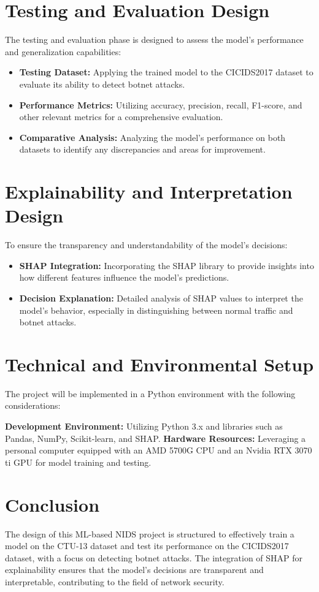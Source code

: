 \section{Testing and Evaluation Design}
The testing and evaluation phase is designed to assess the model's performance and generalization capabilities:

\begin{itemize}
    \item \textbf{Testing Dataset:} Applying the trained model to the CICIDS2017 dataset to evaluate its ability to detect botnet attacks.
    \item \textbf{Performance Metrics:} Utilizing accuracy, precision, recall, F1-score, and other relevant metrics for a comprehensive evaluation.
    \item \textbf{Comparative Analysis:} Analyzing the model's performance on both datasets to identify any discrepancies and areas for improvement.
\end{itemize}

\section{Explainability and Interpretation Design}
To ensure the transparency and understandability of the model's decisions:

\begin{itemize}
    \item \textbf{SHAP Integration:} Incorporating the SHAP library to provide insights into how different features influence the model's predictions.
    \item \textbf{Decision Explanation:} Detailed analysis of SHAP values to interpret the model's behavior, especially in distinguishing between normal traffic and botnet attacks.
\end{itemize}

\section{Technical and Environmental Setup}
The project will be implemented in a Python environment with the following considerations:

\textbf{Development Environment:} Utilizing Python 3.x and libraries such as Pandas, NumPy, Scikit-learn, and SHAP.\@
\textbf{Hardware Resources:} Leveraging a personal computer equipped with an AMD 5700G CPU and an Nvidia RTX 3070 ti GPU for model training and testing.

\section{Conclusion}
The design of this ML-based NIDS project is structured to effectively train a model on the CTU-13 dataset and test its performance on the CICIDS2017 dataset, with a focus on detecting botnet attacks. The integration of SHAP for explainability ensures that the model's decisions are transparent and interpretable, contributing to the field of network security.
